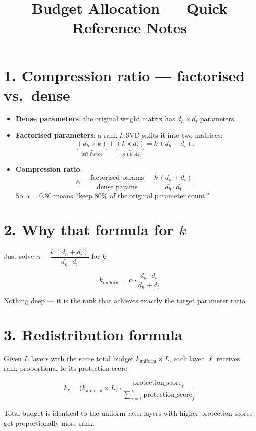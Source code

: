 \documentclass[11pt]{article}
\title{Budget Allocation --- Quick Reference Notes}
\author{}
\date{}
\begin{document}
\maketitle

\section*{1. Compression ratio --- factorised vs.\ dense}

\begin{itemize}
    \item \textbf{Dense parameters}: the original weight matrix has $d_h \times d_i$ parameters.
    \item \textbf{Factorised parameters}: a rank-$k$ SVD splits it into two matrices:
    \[
        \underbrace{(d_h \times k)}_{\text{left factor}} + \underbrace{(k \times d_i)}_{\text{right factor}} = k\,(d_h + d_i).
    \]
    \item \textbf{Compression ratio}:
    \[
        \alpha = \frac{\text{factorised params}}{\text{dense params}} = \frac{k\,(d_h + d_i)}{d_h \cdot d_i}.
    \]
    So $\alpha = 0.80$ means ``keep 80\% of the original parameter count.''
\end{itemize}

\section*{2. Why that formula for $k$}

Just solve $\alpha = \dfrac{k\,(d_h + d_i)}{d_h \cdot d_i}$ for $k$:

\[
    \boxed{k_{\mathrm{uniform}} = \alpha \cdot \frac{d_h \cdot d_i}{d_h + d_i}}
\]

Nothing deep --- it is the rank that achieves exactly the target parameter ratio.

\section*{3. Redistribution formula}

Given $L$ layers with the same total budget $k_{\mathrm{uniform}} \times L$, each layer~$\ell$ receives rank proportional to its protection score:

\[
    \boxed{k_\ell = \bigl(k_{\mathrm{uniform}} \times L\bigr) \cdot \frac{\mathrm{protection\_score}_\ell}{\displaystyle\sum_{j=1}^{L} \mathrm{protection\_score}_j}}
\]

Total budget is identical to the uniform case; layers with higher protection scores get proportionally more rank.
\end{document}

